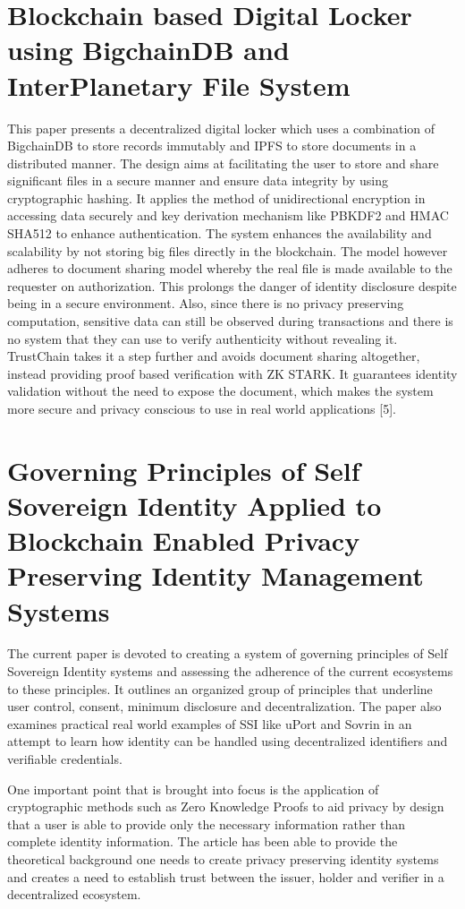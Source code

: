 \section{Blockchain based Digital Locker using BigchainDB and InterPlanetary File System }
\endgroup
This paper presents a decentralized digital locker which uses a combination of BigchainDB to store records immutably and IPFS to store documents in a distributed manner. The design aims at facilitating the user to store and share significant files in a secure manner and ensure data integrity by using cryptographic hashing. It applies the method of unidirectional encryption in accessing data securely and key derivation mechanism like PBKDF2 and HMAC SHA512 to enhance authentication. The system enhances the availability and scalability by not storing big files directly in the blockchain. The model however adheres to document sharing model whereby the real file is made available to the requester on authorization. This prolongs the danger of identity disclosure despite being in a secure environment. Also, since there is no privacy preserving computation, sensitive data can still be observed during transactions and there is no system that they can use to verify authenticity without revealing it.
TrustChain takes it a step further and avoids document sharing altogether, instead providing proof based verification with ZK STARK. It guarantees identity validation without the need to expose the document, which makes the system more secure and privacy conscious to use in real world applications [5].\\

\begingroup
\linespread{0.8}\selectfont
\section{Governing Principles of Self Sovereign Identity Applied to Blockchain Enabled Privacy Preserving Identity Management Systems}
\endgroup
The current paper is devoted to creating a system of governing principles of Self Sovereign Identity systems and assessing the adherence of the current ecosystems to these principles. It outlines an organized group of principles that underline user control, consent, minimum disclosure and decentralization. The paper also examines practical real world examples of SSI like uPort and Sovrin in an attempt to learn how identity can be handled using decentralized identifiers and verifiable credentials. 

One important point that is brought into focus is the application of cryptographic methods such as Zero Knowledge Proofs to aid privacy by design that a user is able to provide only the necessary information rather than complete identity information. The article has been able to provide the theoretical background one needs to create privacy preserving identity systems and creates a need to establish trust between the issuer, holder and verifier in a decentralized ecosystem.

